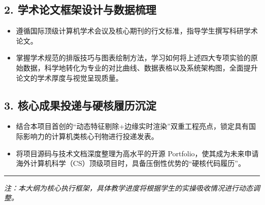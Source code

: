 \documentclass[11pt, a4paper]{ctexart}
\begin{document}
\subsection{2. 学术论文框架设计与数据梳理}
\begin{itemize}[label=$\bullet$]
    \item 遵循国际顶级计算机学术会议及核心期刊的行文标准，指导学生撰写科研学术论文。
    \item 掌握学术规范的排版技巧与图表绘制方法，学习如何将上述四大专项实验的原始数据，科学地转化为专业的对比曲线、数据表格以及系统架构图，全面提升论文的学术厚度与视觉呈现质量。
\end{itemize}

\subsection{3. 核心成果投递与硬核履历沉淀}
\begin{itemize}[label=$\bullet$]
    \item 结合本项目首创的“动态特征剔除+边缘实时渲染”双重工程亮点，锁定具有国际影响力的计算机类核心刊物进行投递发表。
    \item 将项目源码与技术文档深度整理为高水平的开源 Portfolio，使其成为未来申请海外计算机科学（CS）顶级项目时，具备压倒性优势的“硬核代码履历”。
\end{itemize}

\vspace{2em}

\noindent\rule{\textwidth}{0.4pt}
\begin{flushright}
\textit{注：本大纲为核心执行框架，具体教学进度将根据学生的实操吸收情况进行动态调整。}
\end{flushright}
\end{document}
